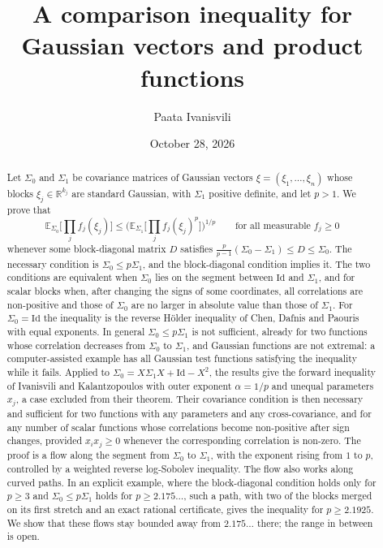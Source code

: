 \documentclass[11pt]{amsart}
\title{A comparison inequality for Gaussian vectors and product functions}
\author{Paata Ivanisvili}
\date{October 28, 2026}
\theoremstyle{definition}
\newcommand{\E}{\mathbb{E}}
\newcommand{\R}{\mathbb{R}}
\newcommand{\Id}{\mathrm{Id}}
\begin{document}
\sloppy
\begin{abstract}
Let $\Sigma_0$ and $\Sigma_1$ be covariance matrices of Gaussian vectors $\xi=(\xi_1,\dots,\xi_n)$ whose blocks
$\xi_j\in\R^{k_j}$ are standard Gaussian, with $\Sigma_1$ positive definite, and let $p>1$. We prove that
\[
\E_{\Sigma_0}\Big[\prod_jf_j(\xi_j)\Big]\le\Big(\E_{\Sigma_1}\Big[\prod_jf_j(\xi_j)^p\Big]\Big)^{1/p}
\qquad\text{for all measurable }f_j\ge0
\]
whenever some block-diagonal matrix $D$ satisfies $\frac p{p-1}(\Sigma_0-\Sigma_1)\le D\le\Sigma_0$. The necessary
condition is $\Sigma_0\le p\Sigma_1$, and the block-diagonal condition implies it. The two conditions are equivalent
when $\Sigma_0$ lies on the segment between $\Id$ and $\Sigma_1$, and for scalar blocks when, after changing the
signs of some coordinates, all correlations are non-positive and those of $\Sigma_0$ are no larger in absolute value
than those of $\Sigma_1$. For $\Sigma_0=\Id$ the inequality is the reverse H\"older inequality of Chen, Dafnis and
Paouris with equal exponents. In general $\Sigma_0\le p\Sigma_1$ is not sufficient, already for two functions whose
correlation decreases from $\Sigma_0$ to $\Sigma_1$, and Gaussian functions are not extremal: a computer-assisted
example has all Gaussian test functions satisfying the inequality while it fails. Applied to $\Sigma_0=X\Sigma_1X+\Id-X^2$, the results give the forward inequality of
Ivanisvili and Kalantzopoulos with outer exponent $\alpha=1/p$ and unequal parameters $x_j$, a case excluded from
their theorem. Their covariance condition is then necessary and sufficient for two functions with any parameters and
any cross-covariance, and for any number of scalar functions whose correlations become non-positive after sign
changes, provided $x_ix_j\ge0$ whenever the corresponding correlation is non-zero. The proof is a flow along
the segment from $\Sigma_0$ to $\Sigma_1$, with the exponent rising from $1$ to $p$, controlled by a weighted reverse
log-Sobolev inequality. The flow also works along curved paths. In an explicit example, where the block-diagonal
condition holds only for $p\ge3$ and $\Sigma_0\le p\Sigma_1$ holds for $p\ge2.175\ldots$, such a path, with two of the
blocks merged on its first stretch and an exact rational certificate, gives the inequality for $p\ge2.1925$. We show
that these flows stay bounded away from $2.175\ldots$ there; the range in between is open.
\end{abstract}
\makeatletter
\let\aidisc@setabstracta\@setabstracta
\def\@setabstracta{\par\vskip 10pt{\centering\small\itshape
This proof was generated on October 28, 2026, by Grok Bot using Cursor’s agents, guided by several prompts from Paata Ivanisvili
\par}\aidisc@setabstracta}
\makeatother
\maketitle
\end{document}
